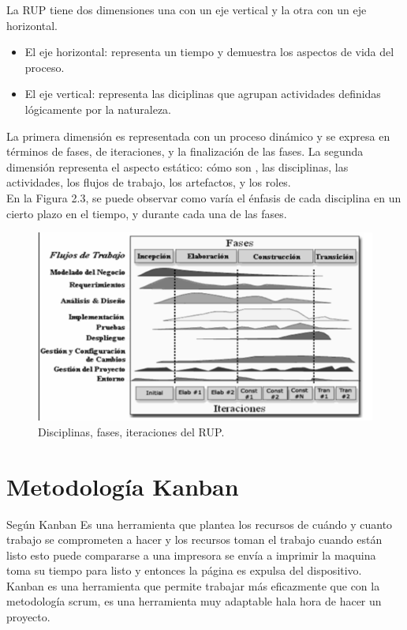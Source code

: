 \documentclass[letterpaper,oneside,openany,11pt]{book}
\begin{document}
La RUP tiene dos dimensiones una con un eje vertical y la otra con un eje horizontal.\\

\begin{itemize}
	\item El eje horizontal: representa un tiempo y demuestra los aspectos de vida del proceso.
	
	\item El eje vertical: representa las diciplinas que agrupan actividades definidas lógicamente por la naturaleza.
\end{itemize}
La primera dimensión es representada con un proceso dinámico y se expresa en términos de fases, de iteraciones, y la finalización de las fases.
La segunda dimensión representa el aspecto estático: cómo son , las disciplinas, las actividades, los flujos de trabajo, los artefactos, y los roles. \\

En la Figura 2.3, se puede observar como varía el énfasis de cada disciplina en un cierto plazo en el tiempo, y durante cada una de las fases. \\

\begin{figure}[H]
	\centering
	\includegraphics[width=1.0\textwidth]{./Imagenes/3}
	\caption{Disciplinas, fases, iteraciones del RUP.}
\end{figure}

\section{Metodología Kanban}
\noindent Según \cite{David} Kanban Es una herramienta que plantea los recursos de cuándo y cuanto trabajo se comprometen a hacer y los recursos toman el trabajo cuando están listo esto puede compararse a una impresora se envía a imprimir la maquina toma su tiempo para listo y entonces la página es expulsa del dispositivo.
\\
Kanban es una herramienta que permite trabajar más eficazmente que con la metodología scrum, es una herramienta muy adaptable hala hora de hacer un proyecto.\\
\end{document}
